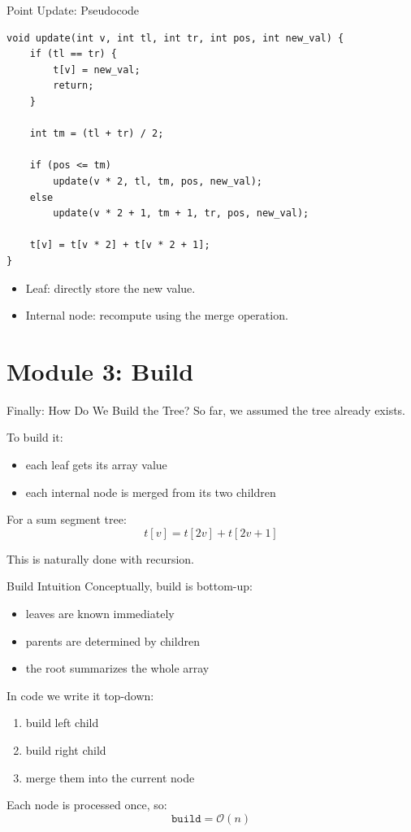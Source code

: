 \documentclass[aspectratio=169]{beamer}
\begin{document}
\begin{frame}[fragile]{Point Update: Pseudocode}
\scriptsize
\begin{verbatim}
void update(int v, int tl, int tr, int pos, int new_val) {
    if (tl == tr) {
        t[v] = new_val;
        return;
    }
    
    int tm = (tl + tr) / 2;

    if (pos <= tm)
        update(v * 2, tl, tm, pos, new_val);
    else
        update(v * 2 + 1, tm + 1, tr, pos, new_val);

    t[v] = t[v * 2] + t[v * 2 + 1];
}
\end{verbatim}

    \normalsize
    \begin{itemize}
        \item Leaf: directly store the new value.
        \item Internal node: recompute using the merge operation.
    \end{itemize}
\end{frame}


\section{Module 3: Build}

\begin{frame}{Finally: How Do We Build the Tree?}
    So far, we assumed the tree already exists.

    To build it:
    \begin{itemize}
        \item each leaf gets its array value
        \item each internal node is merged from its two children
    \end{itemize}

    For a sum segment tree:
    $$
    t[v] = t[2v] + t[2v+1]
    $$

    This is naturally done with recursion.
\end{frame}

\begin{frame}{Build Intuition}
    Conceptually, build is bottom-up:
    \begin{itemize}
        \item leaves are known immediately
        \item parents are determined by children
        \item the root summarizes the whole array
    \end{itemize}

    In code we write it top-down:
    \begin{enumerate}
        \item build left child
        \item build right child
        \item merge them into the current node
    \end{enumerate}

    Each node is processed once, so:
    $$
    \texttt{build} = \mathcal{O}(n)
    $$
\end{frame}
\end{document}
